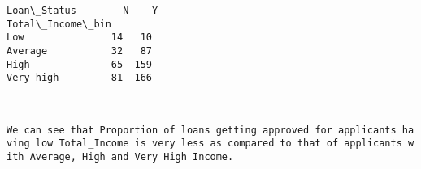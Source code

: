 \documentclass[11pt]{article}
\begin{document}
    \begin{Verbatim}[commandchars=\\\{\}]
Loan\_Status        N    Y
Total\_Income\_bin         
Low               14   10
Average           32   87
High              65  159
Very high         81  166

    \end{Verbatim}

    \begin{center}
    \end{center}
    { \hspace*{\fill} \\}
    
    \texttt{We\ can\ see\ that\ Proportion\ of\ loans\ getting\ approved\ for\ applicants\ having\ low\ Total\_Income\ is\ very\ less\ as\ compared\ to\ that\ of\ applicants\ with\ Average,\ High\ and\ Very\ High\ Income.}
\end{document}
